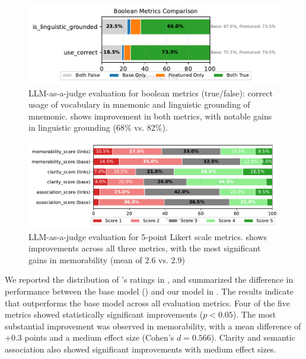 \begin{figure}[htb]
  \centering
  \includegraphics[width=\linewidth]{figures/boolean_comparison.pdf}
  \caption{LLM-as-a-judge evaluation for boolean metrics (true/false): correct usage of vocabulary in mnemonic and linguistic grounding of mnemonic. \linksys shows improvement in both metrics, with notable gains in linguistic grounding (68\% vs. 82\%).}
  \label{fig:llm-judge-boolean}
\end{figure}

\begin{figure}[htb]
  \centering
  \includegraphics[width=\linewidth]{figures/likert_distribution.pdf}
  \caption{LLM-as-a-judge evaluation for 5-point Likert scale metrics. \linksys shows improvements across all three metrics, with the most significant gains in memorability (mean of 2.6 vs. 2.9)}
  \label{fig:llm-judge-likert}
\end{figure}

We reported the distribution of \judgemodel's ratings in , and summarized the difference in performance between the base model (\studentmodel) and our model in . The results indicate that \linksys outperforms the base model across all evaluation metrics. Four of the five metrics showed statistically significant improvements ($p < 0.05$). The most substantial improvement was observed in memorability, with a mean difference of $+0.3$ points and a medium effect size (Cohen's $d = 0.566$). Clarity and semantic association also showed significant improvements with medium effect sizes.

